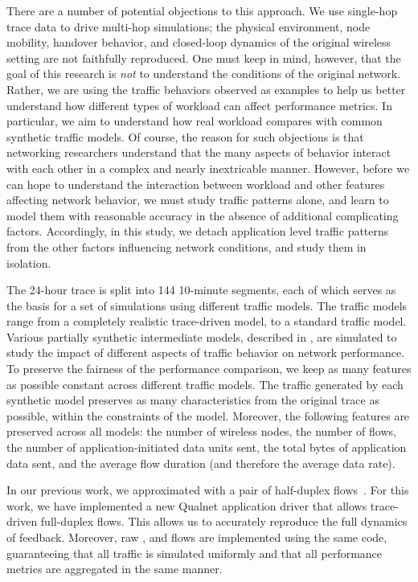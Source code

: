 \documentclass[twocolumn,final]{svjour3}
\begin{document}
There are a number of potential objections to this approach. We use single-hop trace data to drive multi-hop simulations; the physical environment, node mobility, handover behavior, and closed-loop dynamics of the original wireless setting are not faithfully reproduced. One must keep in mind, however, that the goal of this research is \textit{not} to understand the conditions of the original network. Rather, we are using the traffic behaviors observed as examples to help us better understand how different types of workload can affect performance metrics. In particular, we aim to understand how real workload compares with common synthetic traffic models. Of course, the reason for such objections is that networking researchers understand that the many aspects of behavior interact with each other in a complex and nearly inextricable manner. However, before we can hope to understand the interaction between workload and other features affecting network behavior, we must study traffic patterns alone, and learn to model them with reasonable accuracy in the absence of additional complicating factors. Accordingly, in this study, we detach application level traffic patterns from the other factors influencing network conditions, and study them in isolation.

The 24-hour trace is split into 144 10-minute segments, each of which serves as the basis for a set of simulations using different traffic models. The traffic models range from a completely realistic trace-driven model, to a standard  traffic model. Various partially synthetic intermediate models, described in , are simulated to study the impact of different aspects of traffic behavior on network performance. To preserve the fairness of the performance comparison, we keep as many features as possible constant across different traffic models. The traffic generated by each synthetic model preserves as many characteristics from the original trace as possible, within the constraints of the model. Moreover, the following features are preserved across all models: the number of wireless nodes, the number of flows, the number of application-initiated data units sent, the total bytes of application data sent, and the average flow duration (and therefore the average data rate).

In our previous work, we approximated  with a pair of half-duplex  flows~\cite{Karpinski07:realism,Karpinski07:cbr-failure}. For this work, we have implemented a new Qualnet application driver that allows trace-driven full-duplex  flows. This allows us to accurately reproduce the full dynamics of  feedback. Moreover, raw ,  and  flows are implemented using the same code, guaranteeing that all traffic is simulated uniformly and that all performance metrics are aggregated in the same manner.
\end{document}
